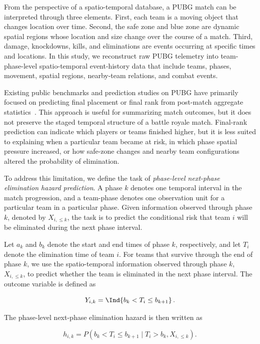 From the perspective of a spatio-temporal database, a PUBG match can be interpreted through three elements. First, each team is a moving object that changes location over time. Second, the safe zone and blue zone are dynamic spatial regions whose location and size change over the course of a match. Third, damage, knockdowns, kills, and eliminations are events occurring at specific times and locations. In this study, we reconstruct raw PUBG telemetry into team-phase-level spatio-temporal event-history data that include teams, phases, movement, spatial regions, nearby-team relations, and combat events.

Existing public benchmarks and prediction studies on PUBG have primarily focused on predicting final placement or final rank from post-match aggregate statistics~\cite{kagglePubgFinishPlacement,sen2021pubgFinalRank,lee2025pubgRank}. This approach is useful for summarizing match outcomes, but it does not preserve the staged temporal structure of a battle royale match. Final-rank prediction can indicate which players or teams finished higher, but it is less suited to explaining when a particular team became at risk, in which phase spatial pressure increased, or how safe-zone changes and nearby team configurations altered the probability of elimination.

To address this limitation, we define the task of \textit{phase-level next-phase elimination hazard prediction}. A phase \(k\) denotes one temporal interval in the match progression, and a team-phase denotes one observation unit for a particular team in a particular phase. Given information observed through phase \(k\), denoted by \(X_{i,\leq k}\), the task is to predict the conditional risk that team \(i\) will be eliminated during the next phase interval.

Let \(a_k\) and \(b_k\) denote the start and end times of phase \(k\), respectively, and let \(T_i\) denote the elimination time of team \(i\). For teams that survive through the end of phase \(k\), we use the spatio-temporal information observed through phase \(k\), \(X_{i,\leq k}\), to predict whether the team is eliminated in the next phase interval. The outcome variable is defined as

\[
Y_{i,k}
=
\Ind\!\left\{b_k < T_i \leq b_{k+1}\right\}.
\]

The phase-level next-phase elimination hazard is then written as

\[
h_{i,k}
=
P(b_k < T_i \leq b_{k+1}
\mid T_i > b_k, X_{i,\leq k}).
\]

